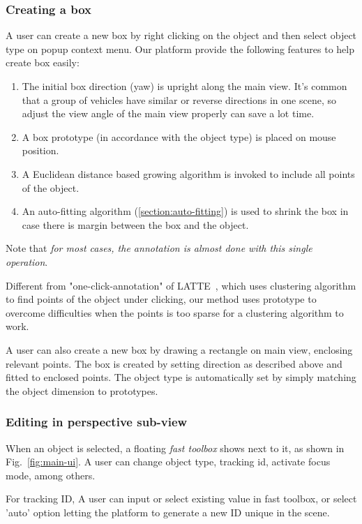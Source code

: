 \documentclass[letterpaper, 10 pt, conference]{ieeeconf}  %
\begin{document}
\subsubsection{Creating a box}
\label{section:create-box}
A user can create a new box by right clicking on the object  and then select object type on popup context menu. Our platform provide the following features to help create box easily:

\begin{enumerate}
	\item The initial box direction (yaw) is upright along the main view. It's common that a group of vehicles have similar or reverse directions in one scene, so adjust the view angle of the main view properly can save a lot time.
	\item A box prototype (in accordance with the object type) is placed on mouse position.
	\item A Euclidean distance based growing algorithm is invoked to include all points of the object.
	\item An auto-fitting algorithm (\ref{section:auto-fitting}) is used to shrink the box in case there is margin between the box and the object.
\end{enumerate}

Note that \emph{for most cases, the annotation is almost done with this single operation}.

Different from "one-click-annotation" of LATTE~\cite{pointatme}, which uses clustering algorithm to find points of the object under clicking, our method uses prototype to overcome difficulties when the points is too sparse for a clustering algorithm to work.

A user can also create a new box by drawing a rectangle on main view,  enclosing relevant points. The box is created by setting direction  as described above and fitted to enclosed points. The object type is automatically set by simply matching the object dimension to prototypes.


\subsubsection{Editing in perspective sub-view}

When an object is selected, a floating \emph{fast toolbox} shows next to it, as shown in Fig.~\ref{fig:main-ui}. A user can change object type, tracking id, activate focus mode, among others.

For tracking ID, A user  can input or select existing value in fast toolbox, or select 'auto' option  letting the platform to generate a new ID unique in the scene.
\end{document}

